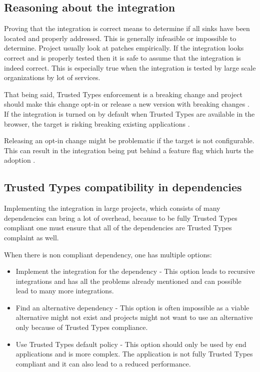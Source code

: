 \subsection{Reasoning about the integration}
\label{sub:reason_about_integration}

Proving that the integration is correct means to determine if all sinks have been located and
properly addressed. This is generally infeasible or impossible to determine. Project usually look at
patches empirically. If the integration looks correct and is properly tested then it is safe to
assume that the integration is indeed correct. This is especially true when the integration is
tested by large scale organizations by lot of services.

That being said, Trusted Types enforcement is a breaking change and project should make this change
opt-in or release a new version with breaking changes \cite{dom_purify_major_version}. If the
integration is turned on by default when Trusted Types are available in the browser, the target is
risking breaking existing applications \cite{dom_purify_breakage}.

Releasing an opt-in change might be problematic if the target is not configurable. This can result
in the integration being put behind a feature flag which hurts the adoption
\cite{react_tt_feature_flag}.

\subsection{Trusted Types compatibility in dependencies}
\label{sub:tt_compatibility_in_deps}

Implementing the integration in large projects, which consists of many dependencies can bring a lot
of overhead, because to be fully Trusted Types compliant one must ensure that all of the
dependencies are Trusted Types complaint as well.

When there is non compliant dependency, one has multiple options:

\begin{itemize}
  \item Implement the integration for the dependency - This option leads to recursive integrations
        and has all the problems already mentioned and can possible lead to many more integrations.
  \item Find an alternative dependency - This option is often impossible as a viable alternative
        might not exist and projects might not want to use an alternative only because of Trusted
        Types compliance.
  \item Use Trusted Types default policy - This option should only be used by end applications and
        is more complex. The application is not fully Trusted Types compliant and it can also lead
        to a reduced performance.
\end{itemize}

